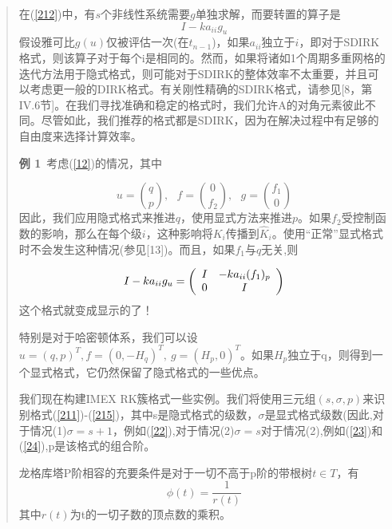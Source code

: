 \documentclass{article}
\begin{document}
\begin{CJK}{UTF8}{gkai}
\begin{quotation}
在(\ref{212})中，有$s$个非线性系统需要$g$单独求解，而要转置的算子是
\begin{equation}
I-ka_{ii}g_{u}
\end{equation}
假设雅可比$g(u)$仅被评估一次(在$t_{n-1}$)，如果$a_{ii}$独立于$i$，即对于SDIRK格式，则该算子对于每个i是相同的。然而，如果将诸如1个周期多重网格的迭代方法用于隐式格式，则可能对于SDIRK的整体效率不太重要，并且可以考虑更一般的DIRK格式。有关刚性精确的SDIRK格式，请参见[8，第IV.6节]。在我们寻找准确和稳定的格式时，我们允许A的对角元素彼此不同。尽管如此，我们推荐的格式都是SDIRK，因为在解决过程中有足够的自由度来选择计算效率。

\textbf{例 1}~考虑(\ref{12})的情况，其中

\begin{equation}
u=\binom{q}{p},~~~f=\binom{0}{f_{2}},~~~g=\binom{f_{1}}{0}
\end{equation}
因此，我们应用隐式格式来推进$q$，使用显式方法来推进$p$。如果$f_{2}$受控制函数的影响，那么在每个级$i$，这种影响将$K_{i}$传播到$\widehat{K}_{i}$。使用“正常”显式格式时不会发生这种情况(参见[13])。而且，如果$f_{1}$与$q$无关,则

\begin{equation}
I-ka_{ii}g_{u}=\left(
\begin{array}{c c}
I & -ka_{ii}(f_{1})_{p}\\
0 & I\\
\end{array}
\right)
\end{equation}
这个格式就变成显示的了！

特别是对于哈密顿体系，我们可以设$u=(q,p)^T,f=(0,-H_{q})^T,~g=(H_{p},0)^T$。如果$H_{p}$独立于q，则得到一个显式格式，它仍然保留了隐式格式的一些优点。


我们现在构建IMEX RK簇格式一些实例。我们将使用三元组$(s,\sigma,p)$来识别格式(\ref{211})-(\ref{215})，其中s是隐式格式的级数，$\sigma$是显式格式级数(因此,对于情况(1)$\sigma=s+1$，例如(\ref{22}),对于情况(2)$\sigma=s$对于情况(2),例如(\ref{23})和(\ref{24}),p是该格式的组合阶。


龙格库塔P阶相容的充要条件是对于一切不高于p阶的带根树$t\in T$，有
\begin{equation*}
\phi(t)=\frac{1}{r(t)}
\end{equation*}
其中$r(t)$为t的一切子数的顶点数的乘积。


\end{quotation}
\end{CJK}
\end{document}
